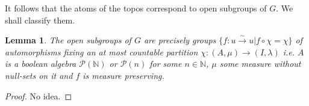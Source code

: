 \documentclass[a4paper,draft]{amsproc}
\theoremstyle{plain}
\newtheorem{lemma}{Lemma}[section]
\theoremstyle{definition}
\theoremstyle{remark}
\numberwithin{equation}{section}
\begin{document}
It follows that the atoms of the topos correspond to open subgroups of $G$. We shall classify them. %
\begin{lemma} The open subgroups of $G$ are precisely groups $\{f:u\overset{\sim}{\rightarrow} u| f\circ \chi=\chi\} $ of automorphisms fixing an at most countable partition $\chi: (A,\mu)\rightarrow (I,\lambda)$ i.e. $A$ is a boolean algebra $\mathcal{P}(\mathbb{N})$ or $\mathcal{P}(n)$ for some $n\in\mathbb{N}$, $\mu$ some measure without null-sets on it and $f$ is measure preserving.
\end{lemma}
\begin{proof} No idea.
\end{proof}
\end{document}
